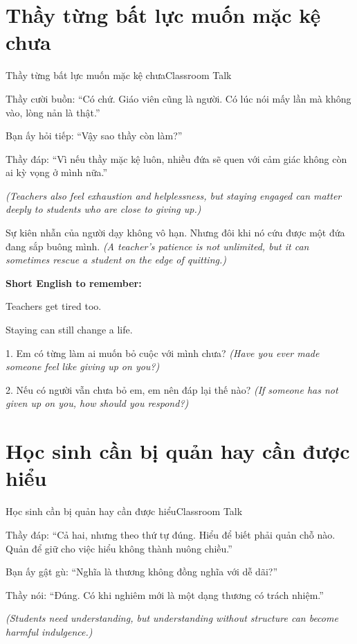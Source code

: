 \section{Thầy từng bất lực muốn mặc kệ chưa}
\begin{truyen}{Thầy từng bất lực muốn mặc kệ chưa}{Classroom Talk}

Thầy cười buồn: ``Có chứ. Giáo viên cũng là người. Có lúc nói mấy lần mà không vào, lòng nản là thật.''

Bạn ấy hỏi tiếp: ``Vậy sao thầy còn làm?''

Thầy đáp: ``Vì nếu thầy mặc kệ luôn, nhiều đứa sẽ quen với cảm giác không còn ai kỳ vọng ở mình nữa.''

\textit{(Teachers also feel exhaustion and helplessness, but staying engaged can matter deeply to students who are close to giving up.)}
\end{truyen}

\begin{baihoc}
Sự kiên nhẫn của người dạy không vô hạn. Nhưng đôi khi nó cứu được một đứa đang sắp buông mình.
\textit{(A teacher’s patience is not unlimited, but it can sometimes rescue a student on the edge of quitting.)}
\end{baihoc}

\begin{ghinhoanh}
\textbf{Short English to remember:}

Teachers get tired too.

Staying can still change a life.
\end{ghinhoanh}

\begin{tuhocnhanh}
1. Em có từng làm ai muốn bỏ cuộc với mình chưa? \textit{(Have you ever made someone feel like giving up on you?)}

2. Nếu có người vẫn chưa bỏ em, em nên đáp lại thế nào? \textit{(If someone has not given up on you, how should you respond?)}
\end{tuhocnhanh}
\ngancach

\section{Học sinh cần bị quản hay cần được hiểu}
\begin{truyen}{Học sinh cần bị quản hay cần được hiểu}{Classroom Talk}

Thầy đáp: ``Cả hai, nhưng theo thứ tự đúng. Hiểu để biết phải quản chỗ nào. Quản để giữ cho việc hiểu không thành nuông chiều.''

Bạn ấy gật gù: ``Nghĩa là thương không đồng nghĩa với dễ dãi?''

Thầy nói: ``Đúng. Có khi nghiêm mới là một dạng thương có trách nhiệm.''

\textit{(Students need understanding, but understanding without structure can become harmful indulgence.)}
\end{truyen}

